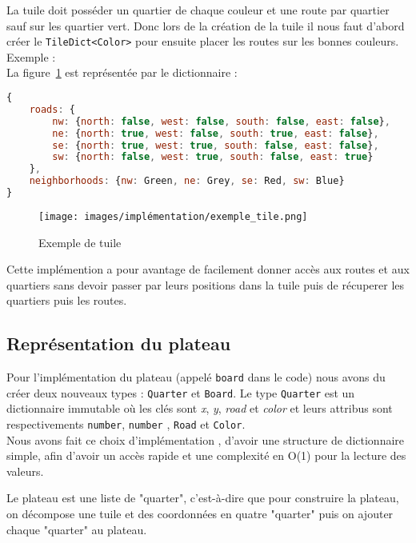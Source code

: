 La tuile doit posséder un quartier de chaque couleur et une route par quartier sauf sur les quartier vert. Donc lors de la création de la tuile il nous faut d'abord créer le \texttt{TileDict<Color>} pour ensuite placer les routes sur les bonnes couleurs. \\

Exemple : \\

La figure~\ref{fig:tile} est représentée par le dictionnaire : \\
\begin{lstlisting}[language=JavaScript]
{
    roads: {
        nw: {north: false, west: false, south: false, east: false}, 
        ne: {north: true, west: false, south: true, east: false}, 
        se: {north: true, west: true, south: false, east: false}, 
        sw: {north: false, west: true, south: false, east: true}
    },
    neighborhoods: {nw: Green, ne: Grey, se: Red, sw: Blue}
}
\end{lstlisting}

\begin{figure}[h]
    \centering
    \texttt{[image: images/implémentation/exemple\_tile.png]}
    \caption{Exemple de tuile}
    \label{fig:tile}
\end{figure}

Cette implémention a pour avantage de facilement donner accès aux routes et aux quartiers sans devoir passer par leurs positions dans la tuile puis de récuperer les quartiers puis les routes.

\subsection{Représentation du plateau}
\label{subsec:board}

Pour l'implémentation du plateau (appelé \texttt{board} dans le code) nous avons du créer deux nouveaux types : \texttt{Quarter} et \texttt{Board}. Le type \texttt{Quarter} est un dictionnaire immutable où les clés sont \textit{x}, \textit{y}, \textit{road} et \textit{color} et leurs attribus sont respectivements \texttt{number}, \texttt{number} , \texttt{Road} et \texttt{Color}.\\

Nous avons fait ce choix d'implémentation , d'avoir une structure de dictionnaire simple, afin d'avoir un accès rapide et une complexité en O(1) pour la lecture des valeurs.

Le plateau est une liste de "quarter", c'est-à-dire que pour construire la plateau, on décompose une tuile et des coordonnées en quatre "quarter" puis on ajouter chaque "quarter" au plateau.\\

